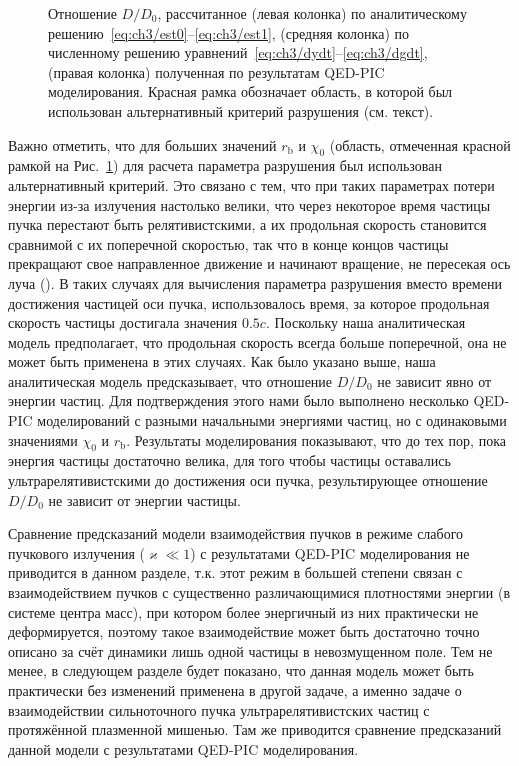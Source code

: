 \begin{figure}[ht]
    \caption[Сравнение отношения параметра разрушения с учётом реакции излучения к таковому без учёта реакции излучения, рассчитанного различными способами]{\label{fig:ch3/disruption} 
    Отношение $D/ D_0$, рассчитанное (левая колонка) по аналитическому решению~\eqref{eq:ch3/est0}--\eqref{eq:ch3/est1}, (средняя колонка) по численному решению уравнений~\eqref{eq:ch3/dydt}--\eqref{eq:ch3/dgdt}, (правая колонка) полученная по результатам QED-PIC моделирования.
    Красная рамка обозначает область, в которой был использован альтернативный критерий разрушения (см. текст).}
\end{figure}

Важно отметить, что для больших значений $r_\mathrm{b}$ и $\chi_0$ (область, отмеченная красной рамкой на Рис.~\ref{fig:ch3/disruption}) для расчета параметра разрушения был использован альтернативный критерий.
Это связано с тем, что при таких параметрах потери энергии из-за излучения настолько велики, что через некоторое время частицы пучка перестают быть релятивистскими, а их продольная скорость становится сравнимой с их поперечной скоростью, так что в конце концов частицы прекращают свое направленное движение и начинают вращение, не пересекая ось луча ().
В таких случаях для вычисления параметра разрушения вместо времени достижения частицей оси пучка, использовалось время, за которое продольная скорость частицы достигала значения $0.5c$.
Поскольку наша аналитическая модель предполагает, что продольная скорость всегда больше поперечной, она не может быть применена в этих случаях.
Как было указано выше, наша аналитическая модель предсказывает, что отношение $D/D_0$ не зависит явно от энергии частиц.
Для подтверждения этого нами было выполнено несколько QED-PIC моделирований с разными начальными энергиями частиц, но с одинаковыми значениями $\chi_0$ и $r_\mathrm{b}$.
Результаты моделирования показывают, что до тех пор, пока энергия частицы достаточно велика, для того чтобы частицы оставались ультрарелятивистскими до достижения оси пучка, результирующее отношение $D/D_0$ не зависит от энергии частицы.

Сравнение предсказаний модели взаимодействия пучков в режиме слабого пучкового излучения ($\varkappa \ll 1$) с результатами QED-PIC моделирования не приводится в данном разделе, т.к. этот режим в большей степени связан с взаимодействием пучков с существенно различающимися плотностями энергии (в системе центра масс), при котором более энергичный из них практически не деформируется, поэтому такое взаимодействие может быть достаточно точно описано за счёт динамики лишь одной частицы в невозмущенном поле.
Тем не менее, в следующем разделе будет показано, что данная модель может быть практически без изменений применена в другой задаче, а именно задаче о взаимодействии сильноточного пучка ультрарелятивистских частиц с протяжённой плазменной мишенью. 
Там же приводится сравнение предсказаний данной модели с результатами QED-PIC моделирования.

